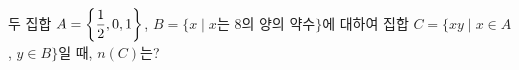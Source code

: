 두 집합 $A=\left\{\dfrac{1}{2}{,}\mkern3mu\mathopen{}0{,}\mkern3mu\mathopen{}1\right\}$, $B=\{x \mid x$는 $8$의 양의 약수$\}$에 대하여 집합 $C=\{xy \mid x\in A$, $y\in B\}$일 때, $n(C)$는?
